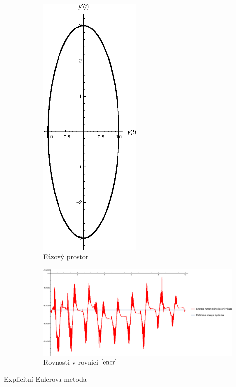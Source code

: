 \begin{description}
\begin{figure}[h]
  \centering
  \includegraphics[width=5cm]{figures/ND2.eps}
  \caption{Fázový prostor}
  \label{fig:ND2}
\end{figure}

\begin{figure}[h]
  \centering
  \includegraphics[width=15cm]{figures/ND3.eps}
  \caption{Rovnosti v rovnici $\eqref{ener}$}
  \label{fig:ND3}
\end{figure}

\item[Explicitní Eulerova metoda] 


\end{description}
